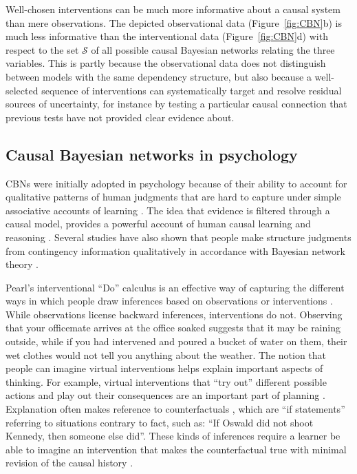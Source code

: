 \documentclass{cambridge7A}%
\begin{document}
Well-chosen interventions can be much more informative about a causal system than mere observations.  The depicted observational data (Figure~\ref{fig:CBN}b) is much less informative than the interventional data (Figure~\ref{fig:CBN}d) with respect to the set $\mathcal{S}$ of all possible causal Bayesian networks relating the three variables.  
This is partly because the observational data does not distinguish between models with the same dependency structure, but also because a well-selected sequence of interventions can systematically target and resolve residual sources of uncertainty, for instance by testing a particular causal connection that previous tests have not provided clear evidence about.

\subsection{Causal Bayesian networks in psychology}

CBNs were initially adopted in psychology because of their ability to account for qualitative patterns of human judgments that are hard to capture under simple associative accounts of learning \citep[e.g.,][]{rescorla1972theory,holyoak2011causal,waldmann1992predictive,waldmann1998bayesian}.  
The idea that evidence is filtered through a causal model, provides a powerful account of human causal learning and reasoning \citep{cheng1997from,waldmann2000competition,griffiths2005structure}.  Several studies have also shown that people make structure judgments  from contingency information qualitatively in accordance with Bayesian network theory \citep{steyvers2009bayesian,mayrhofer2016sufficiency,rothe2018successful}.

Pearl's interventional ``Do'' calculus is an effective way of capturing the different ways in which people draw inferences based on observations or interventions \citep{sloman2005do,waldmann2005seeing}. While observations license backward inferences, interventions do not. Observing that your officemate arrives at the office soaked suggests that it may be raining outside, while if you had intervened and poured a bucket of water on them, their wet clothes would not tell you anything about the weather.  The notion that people can imagine virtual interventions helps explain important aspects of thinking.  For example, virtual interventions that ``try out'' different possible actions and play out their consequences are an important part of planning \citep{pfeiffer2013hippocampal,bramley2017phdthesis}.  Explanation often makes reference to counterfactuals \citep{lagnado2013causal,rips2013inference,rips2010two,lucas2015improved,gerstenberg2015how}, which are ``if statements'' referring to situations contrary to fact, such as: ``If Oswald did not shoot Kennedy, then someone else did''.  These kinds of inferences require a learner be able to imagine an intervention that makes the counterfactual true with minimal revision of the causal history \citep{gerstenberg2013back,rips2010two,lagnado2013causal}. 
\end{document}
